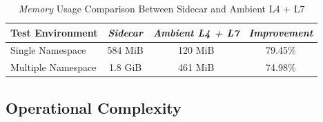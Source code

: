 \begin{table}[ht!]
  \centering
  \begin{tabular}{ |l|c|c|c| }
    \hline
    \textbf{Test Environment} & \textbf{\textit{Sidecar}} & \textbf{\textit{Ambient L4 + L7}} & \textbf{\textit{Improvement}}\\ \hline
    Single Namespace & 584 MiB & 120 MiB & 79.45\% \\ \hline
    Multiple Namespace & 1.8 GiB & 461 MiB & 74.98\% \\ \hline
  \end{tabular}
  \caption{\textit{Memory} Usage Comparison Between Sidecar and Ambient L4 + L7}
  \label{res:sidecarMemVsL4L7}
\end{table}

\subsection{Operational Complexity}
